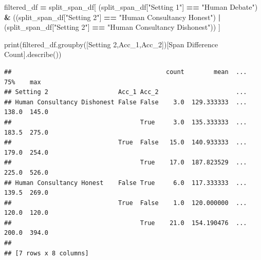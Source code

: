 \documentclass[
]{article}
\newenvironment{Shaded}{\begin{snugshade}}{\end{snugshade}}
\newcommand{\BuiltInTok}[1]{#1}
\newcommand{\NormalTok}[1]{#1}
\newcommand{\OperatorTok}[1]{\textcolor[rgb]{0.81,0.36,0.00}{\textbf{#1}}}
\newcommand{\StringTok}[1]{\textcolor[rgb]{0.31,0.60,0.02}{#1}}
\begin{document}
\begin{Shaded}
\begin{Highlighting}[]
\NormalTok{filtered\_df }\OperatorTok{=}\NormalTok{ split\_span\_df[}
\NormalTok{    (split\_span\_df[}\StringTok{"Setting 1"}\NormalTok{] }\OperatorTok{==} \StringTok{"Human Debate"}\NormalTok{) }\OperatorTok{\&}
\NormalTok{    ((split\_span\_df[}\StringTok{"Setting 2"}\NormalTok{] }\OperatorTok{==} \StringTok{"Human Consultancy Honest"}\NormalTok{) }\OperatorTok{|}\NormalTok{ (split\_span\_df[}\StringTok{"Setting 2"}\NormalTok{] }\OperatorTok{==} \StringTok{"Human Consultancy Dishonest"}\NormalTok{))}
\NormalTok{]}

\BuiltInTok{print}\NormalTok{(filtered\_df.groupby([}\StringTok{\textquotesingle{}Setting 2\textquotesingle{}}\NormalTok{,}\StringTok{\textquotesingle{}Acc\_1\textquotesingle{}}\NormalTok{,}\StringTok{\textquotesingle{}Acc\_2\textquotesingle{}}\NormalTok{])[}\StringTok{\textquotesingle{}Span Difference Count\textquotesingle{}}\NormalTok{].describe())}
\end{Highlighting}
\end{Shaded}

\begin{verbatim}
##                                          count        mean  ...    75%    max
## Setting 2                   Acc_1 Acc_2                     ...              
## Human Consultancy Dishonest False False    3.0  129.333333  ...  138.0  145.0
##                                   True     3.0  135.333333  ...  183.5  275.0
##                             True  False   15.0  140.933333  ...  179.0  254.0
##                                   True    17.0  187.823529  ...  225.0  526.0
## Human Consultancy Honest    False True     6.0  117.333333  ...  139.5  269.0
##                             True  False    1.0  120.000000  ...  120.0  120.0
##                                   True    21.0  154.190476  ...  200.0  394.0
## 
## [7 rows x 8 columns]
\end{verbatim}
\end{document}

